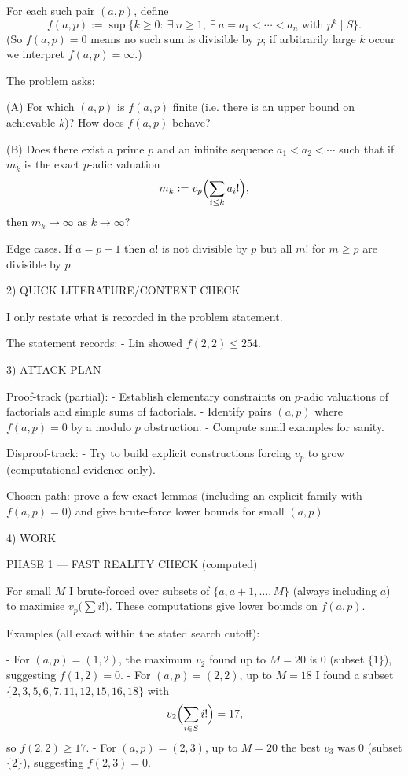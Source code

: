 For each such pair $(a,p)$, define
\[
f(a,p):=\sup\{k\ge 0:\ \exists\ n\ge 1,\ \exists\ a=a_1<\cdots<a_n\text{ with }p^k\mid S\}.
\]
(So $f(a,p)=0$ means no such sum is divisible by $p$; if arbitrarily large $k$ occur we interpret $f(a,p)=\infty$.)

The problem asks:

(A) For which $(a,p)$ is $f(a,p)$ finite (i.e. there is an upper bound on achievable $k$)? How does $f(a,p)$ behave?

(B) Does there exist a prime $p$ and an infinite sequence $a_1<a_2<\cdots$ such that if $m_k$ is the exact $p$-adic valuation
\[
m_k:=v_p\Bigl(\sum_{i\le k} a_i!\Bigr),
\]
then $m_k\to\infty$ as $k\to\infty$?

Edge cases.
If $a=p-1$ then $a!$ is not divisible by $p$ but all $m!$ for $m\ge p$ are divisible by $p$.

2) QUICK LITERATURE/CONTEXT CHECK

I only restate what is recorded in the problem statement.

The statement records:
- Lin showed $f(2,2)\le 254$.

3) ATTACK PLAN

Proof-track (partial):
- Establish elementary constraints on $p$-adic valuations of factorials and simple sums of factorials.
- Identify pairs $(a,p)$ where $f(a,p)=0$ by a modulo $p$ obstruction.
- Compute small examples for sanity.

Disproof-track:
- Try to build explicit constructions forcing $v_p$ to grow (computational evidence only).

Chosen path: prove a few exact lemmas (including an explicit family with $f(a,p)=0$) and give brute-force lower bounds for small $(a,p)$.

4) WORK

PHASE 1 — FAST REALITY CHECK (computed)

For small $M$ I brute-forced over subsets of $\{a,a+1,\dots,M\}$ (always including $a$) to maximise $v_p\bigl(\sum i!\bigr)$.
These computations give lower bounds on $f(a,p)$.

Examples (all exact within the stated search cutoff):

- For $(a,p)=(1,2)$, the maximum $v_2$ found up to $M=20$ is $0$ (subset $\{1\}$), suggesting $f(1,2)=0$.
- For $(a,p)=(2,2)$, up to $M=18$ I found a subset $\{2,3,5,6,7,11,12,15,16,18\}$ with
\[
 v_2\Bigl(\sum_{i\in S} i!\Bigr)=17,
\]
so $f(2,2)\ge 17$.
- For $(a,p)=(2,3)$, up to $M=20$ the best $v_3$ was $0$ (subset $\{2\}$), suggesting $f(2,3)=0$.

